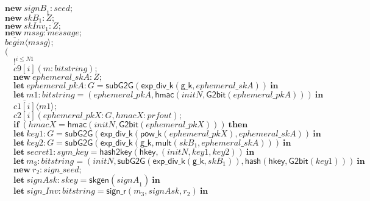 \documentclass{article}
\newcommand{\cinput}[2]{{#1}({#2})}
\newcommand{\coutput}[2]{\overline{#1}\langle{#2}\rangle}
\newcommand{\kw}[1]{\mathbf{#1}}
\newcommand{\kwf}[1]{\mathsf{#1}}
\newcommand{\var}[1]{\mathit{#1}}
\newcommand{\kwt}[1]{\mathit{#1}}
\newcommand{\kwp}[1]{\mathit{#1}}
\newcommand{\kwc}[1]{\mathit{#1}}
\begin{document}
\begin{tabbing}
\>$\kw{new}\ \var{signB}_{1}: \kwt{seed};$\\
\>$\kw{new}\ \var{skB}_{1}: \kwt{Z};$\\
\>$\kw{new}\ \var{skInv}_{1}: \kwt{Z};$\\
\>$\kw{new}\ \var{mssg}: \kwt{message};$\\
\>$\coutput{\kwc{begin}}{\var{mssg}};$\\
\>$($\\
\>$\quad !^{\var{i} \leq \kwp{N1}}$\\
\>$\quad \cinput{\kwc{c9}[\var{i}]}{\var{m}: \kwt{bitstring}};$\\
\>$\quad \kw{new}\ \var{ephemeral{\_}skA}: \kwt{Z};$\\
\>$\quad \kw{let}\ \var{ephemeral{\_}pkA}: \kwt{G} = \kwf{subG2G}(\kwf{exp{\_}div{\_}k}(\kwf{g{\_}k}, \var{ephemeral{\_}skA}))\ \kw{in}$\\
\>$\quad \kw{let}\ \var{m1}: \kwt{bitstring} = \kwf{}(\var{ephemeral{\_}pkA}, \kwf{hmac}(\var{initN}, \kwf{G2bit}(\var{ephemeral{\_}pkA})))\ \kw{in}$\\
\>$\quad \coutput{\kwc{c1}[\var{i}]}{\var{m1}};$\\
\>$\quad \cinput{\kwc{c2}[\var{i}]}{\var{ephemeral{\_}pkX}: \kwt{G}, \var{hmacX}: \kwt{prfout}};$\\
\>$\quad \kw{if}\ (\var{hmacX}  =  \kwf{hmac}(\var{initN}, \kwf{G2bit}(\var{ephemeral{\_}pkX})))\ \kw{then}$\\
\>$\quad \kw{let}\ \var{key1}: \kwt{G} = \kwf{subG2G}(\kwf{exp{\_}div{\_}k}(\kwf{pow{\_}k}(\var{ephemeral{\_}pkX}), \var{ephemeral{\_}skA}))\ \kw{in}$\\
\>$\quad \kw{let}\ \var{key2}: \kwt{G} = \kwf{subG2G}(\kwf{exp{\_}div{\_}k}(\kwf{g{\_}k}, \kwf{mult}(\var{skB}_{1}, \var{ephemeral{\_}skA})))\ \kw{in}$\\
\>$\quad \kw{let}\ \var{secret1}: \kwt{sym{\_}key} = \kwf{hash2key}(\kwf{hkey}, \kwf{}(\var{initN}, \var{key1}, \var{key2}))\ \kw{in}$\\
\>$\quad \kw{let}\ \var{m}_{3}: \kwt{bitstring} = \kwf{}(\var{initN}, \kwf{subG2G}(\kwf{exp{\_}div{\_}k}(\kwf{g{\_}k}, \var{skB}_{1})), \kwf{hash}(\kwf{hkey}, \kwf{G2bit}(\var{key1})))\ \kw{in}$\\
\>$\quad \kw{new}\ \var{r}_{2}: \kwt{sign{\_}seed};$\\
\>$\quad \kw{let}\ \var{signAsk}: \kwt{skey} = \kwf{skgen}(\var{signA}_{1})\ \kw{in}$\\
\>$\quad \kw{let}\ \var{sign{\_}Inv}: \kwt{bitstring} = \kwf{sign{\_}r}(\var{m}_{3}, \var{signAsk}, \var{r}_{2})\ \kw{in}$\\

\end{tabbing}
\end{document}
